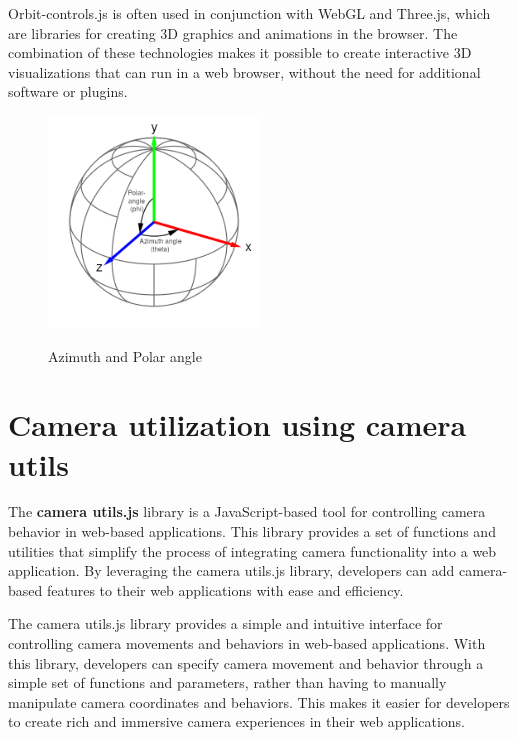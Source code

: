 Orbit-controls.js is often used in conjunction with WebGL and Three.js, which are libraries for creating 
3D graphics and animations in the browser. The combination of these technologies makes it possible to create 
interactive 3D visualizations that can run in a web browser, without the need for additional software or plugins.
\\
\begin{figure}[htb]
  \centering
  \includegraphics[width=0.5\textwidth]{pics/orbitcontrols.png}
  \caption{Azimuth and Polar angle}
  \cite{angles}
  \label{fig:orbitcontrols}
\end{figure}

\section{Camera utilization using camera utils}
The \textbf{camera utils.js} library is a JavaScript-based tool for controlling camera behavior in web-based applications. 
This library provides a set of functions and utilities that simplify the process of integrating camera functionality 
into a web application. By leveraging the camera utils.js library, developers can add camera-based features to 
their web applications with ease and efficiency.

The camera utils.js library provides a simple and intuitive interface for controlling camera movements and behaviors 
in web-based applications. With this library, developers can specify camera movement and behavior through a simple 
set of functions and parameters, rather than having to manually manipulate camera coordinates and behaviors. 
This makes it easier for developers to create rich and immersive camera experiences in their web applications.

